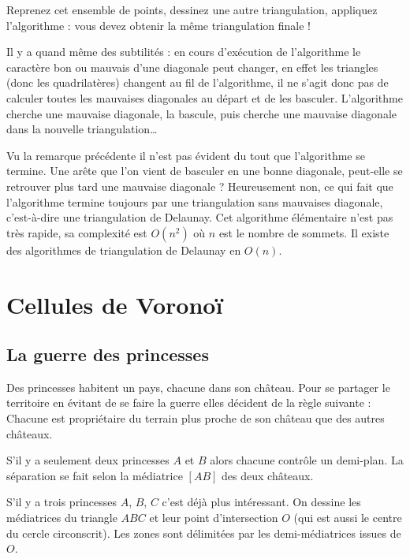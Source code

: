\documentclass[11pt,class=report,crop=false]{standalone}
\begin{document}
Reprenez cet ensemble de points, dessinez une autre triangulation, appliquez l'algorithme : vous devez obtenir la même triangulation finale !



Il y a quand même des subtilités : en cours d'exécution de l'algorithme le caractère bon ou mauvais d'une diagonale peut changer, en effet les triangles (donc les quadrilatères) changent au fil de l'algorithme, il ne s'agit donc pas de calculer toutes les mauvaises diagonales au départ et de les basculer. L'algorithme cherche une mauvaise diagonale, la bascule, puis cherche une mauvaise diagonale dans la nouvelle triangulation\ldots

Vu la remarque précédente il n'est pas évident du tout que l'algorithme se termine. Une arête que l'on vient de basculer en une bonne diagonale, peut-elle se retrouver plus tard une mauvaise diagonale ? Heureusement non, ce qui fait que l'algorithme termine toujours par une triangulation sans mauvaises diagonale, c'est-à-dire une triangulation de Delaunay.
Cet algorithme élémentaire n'est pas très rapide, sa complexité est $O(n^2)$ où $n$ est le nombre de sommets. Il existe des algorithmes de triangulation de Delaunay en $O(n)$.



\section{Cellules de Voronoï}


\subsection{La guerre des princesses}

Des princesses habitent un pays, chacune dans son château. Pour se partager le territoire en évitant de se faire la guerre elles décident de la règle suivante :  \og{}Chacune est propriétaire du terrain plus proche de son château que des autres châteaux.\fg{}


S'il y a seulement deux princesses $A$ et $B$ alors chacune contrôle un demi-plan.
La séparation se fait selon la médiatrice $[AB]$ des deux châteaux.


S'il y a trois princesses $A$, $B$, $C$ c'est déjà plus intéressant. On dessine les médiatrices du triangle $ABC$ et leur point d'intersection $O$ (qui est aussi le centre du cercle circonscrit). Les zones sont délimitées par les \og{}demi-médiatrices\fg{} issues de $O$.
\end{document}
